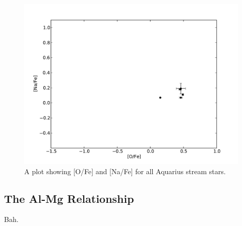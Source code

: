 \documentclass{emulateapj}
\begin{document}



\begin{figure}[h]
	\includegraphics[width=\columnwidth]{./figures/aquarius-o-na.pdf}
	\caption{A plot showing [O/Fe] and [Na/Fe] for all Aquarius stream stars.}
	\label{fig:o-na}
\end{figure}



\subsection{The Al-Mg Relationship}



Bah. 




\end{document}
